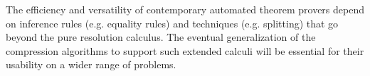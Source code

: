 \documentclass{llncs}
\begin{document}
The efficiency and versatility of contemporary automated theorem provers depend on inference rules (e.g. equality rules) and techniques (e.g. splitting) that go beyond the pure resolution calculus. The eventual generalization of the compression algorithms to support such extended calculi will be essential for their usability on a wider range of problems.

\vspace{-0.35cm}
\begin{footnotesize}
%


\end{footnotesize}



%
%
\end{document}
